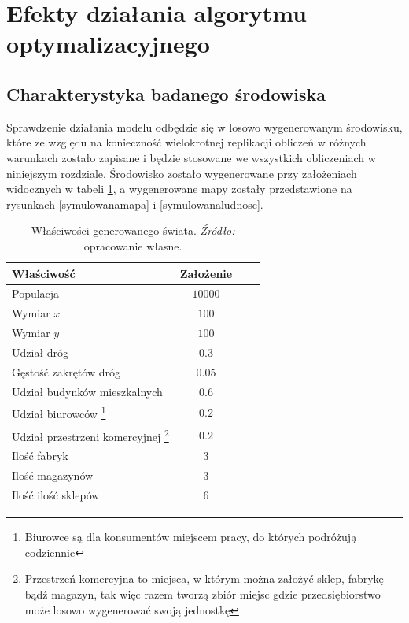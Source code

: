 \documentclass[polish, twoside, 12pt, a4paper]{article}
\theoremstyle{definition}
\theoremstyle{plain}
\theoremstyle{remark}
\begin{document}
\clearpage
\section{Efekty działania algorytmu optymalizacyjnego}

\subsection{Charakterystyka badanego środowiska}

Sprawdzenie działania modelu odbędzie się w losowo wygenerowanym środowisku, które ze względu na konieczność wielokrotnej replikacji obliczeń w różnych warunkach zostało zapisane i będzie stosowane we wszystkich obliczeniach w niniejszym rozdziale. Środowisko zostało wygenerowane przy założeniach widocznych w tabeli \ref{tab:zalozenia}, a wygenerowane mapy zostały przedstawione na rysunkach \ref{symulowanamapa} i \ref{symulowanaludnosc}.

\begin{table}[hbt] 
  \centering

  \captionsetup{margin=10pt,font=small,labelfont=bf,width=.8\textwidth}

  \caption[Przykład prostej tablicy]{Właściwości generowanego świata. \textit{Źródło:} opracowanie własne.}
  \label{tab:zalozenia}

\vspace*{2ex}
  \begin{tabular}{lccc}
    Właściwość        & Założenie \\ \hline
    Populacja & $10 000$\\
    Wymiar $x$ & $100$\\
    Wymiar $y$ & $100$\\ 
    Udział dróg & $0.3$\\ 
    Gęstość zakrętów dróg & $0.05$\\  
    Udział budynków mieszkalnych & $0.6$\\  
    Udział biurowców \footnote{Biurowce są dla konsumentów miejscem pracy, do których podróżują codziennie} & $0.2$\\  
    Udział przestrzeni komercyjnej \footnote{Przestrzeń komercyjna to miejsca, w którym można założyć sklep, fabrykę bądź magazyn, tak więc razem tworzą zbiór miejsc gdzie przedsiębiorstwo może losowo wygenerować swoją jednostkę}& $0.2$\\  \hline
    Ilość fabryk & 3\\ 
    Ilość magazynów & 3\\ 
    Ilość ilość sklepów & 6\\ 
  \end{tabular}
\end{table}
\end{document}

